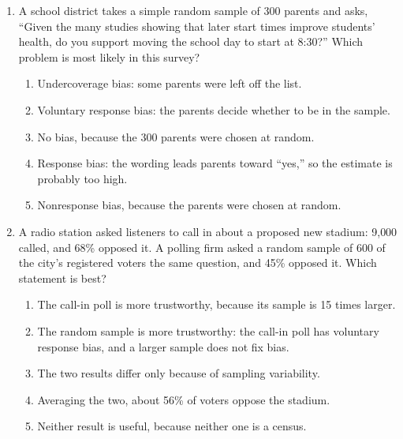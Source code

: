 \documentclass[12pt]{article}
\begin{document}
\begin{enumerate}[leftmargin=1.9em, itemsep=0.13in]
  \boxguard[14]
  \item A school district takes a simple random sample of 300 parents and asks, ``Given the many
        studies showing that later start times improve students' health, do you support moving
        the school day to start at 8:30?'' Which problem is most likely in this survey?
        \begin{enumerate}[label=\textbf{(\Alph*)}, leftmargin=2.2em, itemsep=2pt]
          \item Undercoverage bias: some parents were left off the list.
          \item Voluntary response bias: the parents decide whether to be in the sample.
          \item No bias, because the 300 parents were chosen at random.
          \item Response bias: the wording leads parents toward ``yes,'' so the estimate is
                probably too high.
          \item Nonresponse bias, because the parents were chosen at random.\hfill{}\rule[-0.2in]{0pt}{0.48in}
        \end{enumerate}

  \boxguard[14]
  \item A radio station asked listeners to call in about a proposed new stadium: 9{,}000 called,
        and 68\% opposed it. A polling firm asked a random sample of 600 of the city's
        registered voters the same question, and 45\% opposed it. Which statement is best?
        \begin{enumerate}[label=\textbf{(\Alph*)}, leftmargin=2.2em, itemsep=2pt]
          \item The call-in poll is more trustworthy, because its sample is 15 times larger.
          \item The random sample is more trustworthy: the call-in poll has voluntary response
                bias, and a larger sample does not fix bias.
          \item The two results differ only because of sampling variability.
          \item Averaging the two, about 56\% of voters oppose the stadium.
          \item Neither result is useful, because neither one is a census.\hfill{}\rule[-0.2in]{0pt}{0.48in}
        \end{enumerate}


\end{enumerate}
\end{document}
